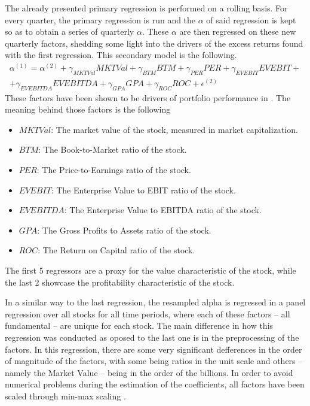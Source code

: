 The already presented primary regression is performed on a rolling basis. For every quarter, the primary regression is run and the $\alpha$ of said regression is kept so as to obtain a series of quarterly $\alpha$. These $\alpha$ are then regressed on these new quarterly factors, shedding some light into the drivers of the excess returns found with the first regression. This secondary model is the following.
\begin{multline}
    \label{eq:secondary-regression}
    \alpha^{(1)}=\alpha^{(2)} + \gamma_{MKTVal}MKTVal + \gamma_{BTM}BTM + \gamma_{PER}PER + \gamma_{EVEBIT}EVEBIT + \\ + \gamma_{EVEBITDA}EVEBITDA + \gamma_{GPA}GPA + \gamma_{ROC}ROC + \epsilon^{(2)}
\end{multline}
These factors have been shown to be drivers of portfolio performance in \cite{ramon_bermejo_climent_2021}. The meaning behind those factors is the following
\begin{itemize}
    \item $MKTVal$: The market value of the stock, measured in market capitalization.
    \item $BTM$: The Book-to-Market ratio of the stock.
    \item $PER$: The Price-to-Earnings ratio of the stock.
    \item $EVEBIT$: The Enterprise Value to EBIT ratio of the stock. 
    \item $EVEBITDA$: The Enterprise Value to EBITDA ratio of the stock.
    \item $GPA$: The Gross Profits to Assets ratio of the stock.
    \item $ROC$: The Return on Capital ratio of the stock. 
\end{itemize}
The first 5 regressors are a proxy for the value characteristic of the stock, while the last 2 showcase the profitability characteristic of the stock. 

In a similar way to the last regression, the resampled alpha is regressed in a panel regression over all stocks for all time periods, where each of these factors -- all fundamental -- are unique for each stock. The main difference in how this regression was conducted as oposed to the last one is in the preprocessing of the factors. In this regression, there are some very significant defferences in the order of magnitude of the factors, with some being ratios in the unit scale and others -- namely the Market Value -- being in the order of the billions. In order to avoid numerical problems during the estimation of the coefficients, all factors have been scaled through min-max scaling \cite{amorim_cavalcanti_cruz_2023}.